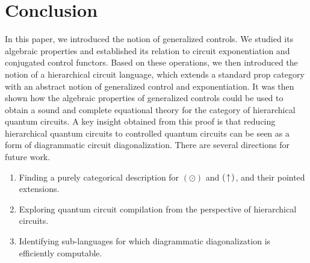 \section{Conclusion}

In this paper, we introduced the notion of generalized controls.
We studied its algebraic properties and established its relation to circuit exponentiation and conjugated control functors.
Based on these operations, we then introduced the notion of a hierarchical circuit language, which extends a standard prop category with an abstract notion of generalized control and exponentiation.
It was then shown how the algebraic properties of generalized controls could be used to obtain a sound and complete equational theory for the category of hierarchical quantum circuits.
A key insight obtained from this proof is that reducing hierarchical quantum circuits to controlled quantum circuits can be seen as a form of diagrammatic circuit diagonalization.
There are several directions for future work.
\begin{enumerate}
\item Finding a purely categorical description for $( \odot )$ and $( \;\!\uparrow\!\; )$, and their pointed extensions.
\item Exploring quantum circuit compilation from the perspective of hierarchical circuits.
\item Identifying sub-languages for which diagrammatic diagonalization is efficiently computable.
\end{enumerate}
